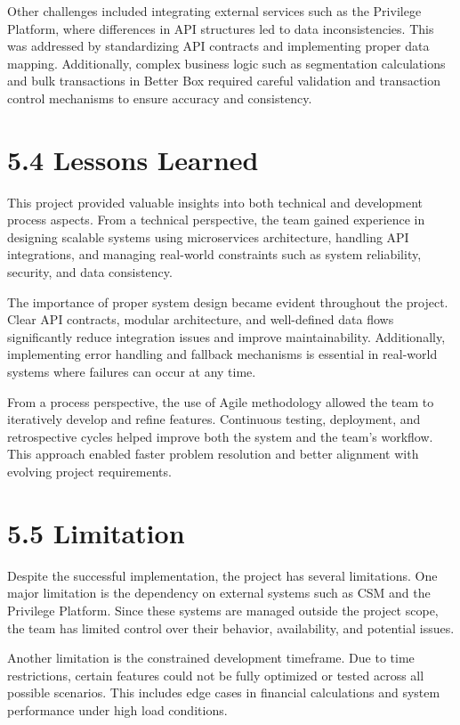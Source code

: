 Other challenges included integrating external services such as the
Privilege Platform, where differences in API structures led to data
inconsistencies. This was addressed by standardizing API contracts and
implementing proper data mapping. Additionally, complex business logic
such as segmentation calculations and bulk transactions in Better Box
required careful validation and transaction control mechanisms to ensure
accuracy and consistency.

\section{\texorpdfstring{\textbf{5.4 Lessons
Learned}}{5.4 Lessons Learned}}\label{lessons-learned}

This project provided valuable insights into both technical and
development process aspects. From a technical perspective, the team
gained experience in designing scalable systems using microservices
architecture, handling API integrations, and managing real-world
constraints such as system reliability, security, and data consistency.

The importance of proper system design became evident throughout the
project. Clear API contracts, modular architecture, and well-defined
data flows significantly reduce integration issues and improve
maintainability. Additionally, implementing error handling and fallback
mechanisms is essential in real-world systems where failures can occur
at any time.

From a process perspective, the use of Agile methodology allowed the
team to iteratively develop and refine features. Continuous testing,
deployment, and retrospective cycles helped improve both the system and
the team's workflow. This approach enabled faster problem resolution and
better alignment with evolving project requirements.

\section{\texorpdfstring{\textbf{5.5
Limitation}}{5.5 Limitation}}\label{limitation}

Despite the successful implementation, the project has several
limitations. One major limitation is the dependency on external systems
such as CSM and the Privilege Platform. Since these systems are managed
outside the project scope, the team has limited control over their
behavior, availability, and potential issues.

Another limitation is the constrained development timeframe. Due to time
restrictions, certain features could not be fully optimized or tested
across all possible scenarios. This includes edge cases in financial
calculations and system performance under high load conditions.

